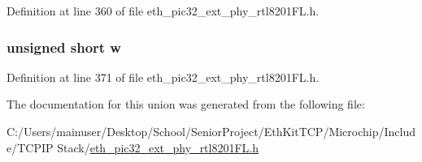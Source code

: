 Definition at line 360 of file eth\+\_\+pic32\+\_\+ext\+\_\+phy\+\_\+rtl8201\+F\+L.\+h.

\hypertarget{union___c_u_s_t_o_m_i_z_e_d_l_e_d_s__t_a160850a4684a3e82c2323033964f2e98}{}
\subsubsection[{w}]{\setlength{\rightskip}{0pt plus 5cm}unsigned short w}\label{union___c_u_s_t_o_m_i_z_e_d_l_e_d_s__t_a160850a4684a3e82c2323033964f2e98}


Definition at line 371 of file eth\+\_\+pic32\+\_\+ext\+\_\+phy\+\_\+rtl8201\+F\+L.\+h.



The documentation for this union was generated from the following file\+:\begin{DoxyCompactItemize}
\item 
C\+:/\+Users/mainuser/\+Desktop/\+School/\+Senior\+Project/\+Eth\+Kit\+T\+C\+P/\+Microchip/\+Include/\+T\+C\+P\+I\+P Stack/\hyperlink{eth__pic32__ext__phy__rtl8201_f_l_8h}{eth\+\_\+pic32\+\_\+ext\+\_\+phy\+\_\+rtl8201\+F\+L.\+h}\end{DoxyCompactItemize}
